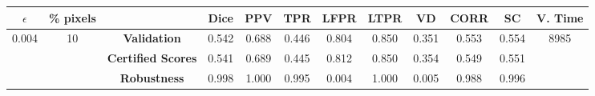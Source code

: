 \begin{longtable}{ c  c | c | c  c  c  c  c  c  c c c}
\toprule \textbf{$\epsilon$} & \textbf{\% pixels} & & \textbf{Dice} & \textbf{PPV} & \textbf{TPR} & \textbf{LFPR} & \textbf{LTPR} & \textbf{VD} & \textbf{CORR} & \textbf{SC} & \textbf{V. Time} \\
\midrule 
\multirow{3}{*}{0.004}  & \multirow{3}{*}{10} &\textbf{Validation} & 0.542 & 0.688 & 0.446 & 0.804 & 0.850 & 0.351 & 0.553 & 0.554 & \multirow{3}{*}{8985} \\
 & & \textbf{Certified Scores} & 0.541 & 0.689 & 0.445 & 0.812 & 0.850 & 0.354 & 0.549 & 0.551 & \\
& & \textbf{Robustness} & 0.998 & 1.000 & 0.995 & 0.004 & 1.000 & 0.005 & 0.988 & 0.996 & \\
\end{longtable}